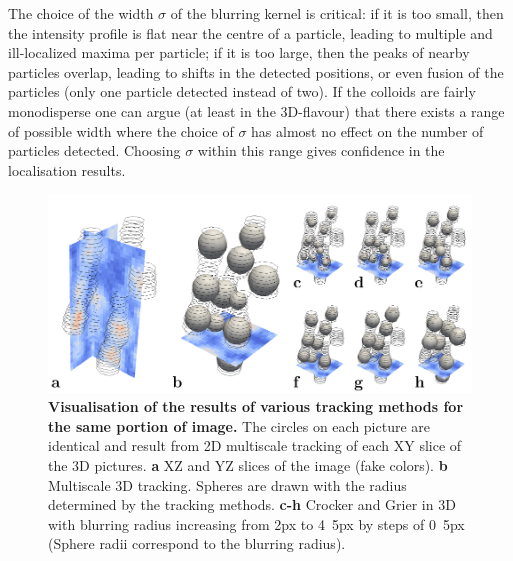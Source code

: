 \documentclass[prl,twocolumn,notitlepage]{revtex4-1}
\begin{document}
The choice of the width $\sigma$ of the blurring kernel is critical: if it is too small, then the intensity profile is flat near the centre  of a particle, leading to multiple and ill-localized maxima per particle; if it is too large, then the peaks of nearby particles overlap, leading to shifts in the detected positions, or even fusion of the particles (only one particle detected instead of two). If the colloids are fairly monodisperse one can argue (at least in the 3D-flavour) that there exists a range of possible width where the choice of $\sigma$ has almost no effect on the number of particles detected. Choosing $\sigma$ within this range gives confidence in the localisation results.

\begin{figure}
\begin{center}
\includegraphics{generate_figures-figure5.pdf}
\end{center}
\caption{\textbf{Visualisation of the results of various tracking methods for the same portion of image.} The circles on each picture are identical and result from 2D multiscale tracking of each XY slice of the 3D pictures. \textbf{a} XZ and YZ slices of the image (fake colors). \textbf{b} Multiscale 3D tracking. Spheres are drawn with the radius determined by the tracking methods. \textbf{c-h} Crocker and Grier in 3D with blurring radius increasing from \unit{2}{px} to \unit{4.5}{px} by steps of \unit{0.5}{px} (Sphere radii correspond to the blurring radius).}
	\label{fig:localise}
\end{figure}
\end{document}

